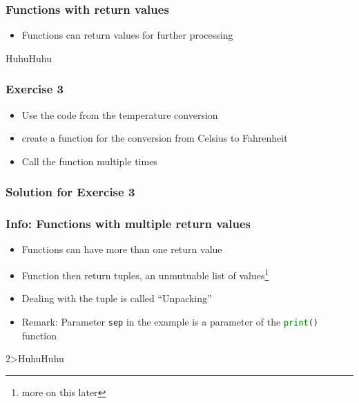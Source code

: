 \documentclass[ngerman]{beamer}
\newcommand{\ta}[1]{\textattachfile[color=1 0 0]{#1}{Code}}
\begin{document}
\begin{frame}[containsverbatim]
\frametitle{Functions with return values}

\begin{itemize}
	\item Functions can return values for further processing
\end{itemize}



\begin{ausgabe}
HuhuHuhu
\end{ausgabe}

\end{frame}


\begin{frame}
\frametitle{Exercise 3}

\begin{itemize}
\item Use the code from the temperature conversion 
\item create a function for the conversion from Celsius to Fahrenheit
\item Call the function multiple times
\end{itemize}
\end{frame}

\begin{frame}[containsverbatim]
\frametitle{Solution for Exercise 3}





\end{frame}


\begin{frame}[containsverbatim]
\frametitle{Info: Functions with multiple return values}

\begin{itemize}
	\item Functions can have more than one return value
	\item Function then return tuples, an unmutuable list of values\footnote{more on this later}
	\item Dealing with the tuple is called \enquote{Unpacking}
	\item Remark: Parameter \texttt{sep} in the example is a parameter \newline of the \lstinline[language={Python}]{print()}  function
\end{itemize}



\vspace*{-1em}
\begin{ausgabe}
2>HuhuHuhu
\end{ausgabe}
\end{frame}
\end{document}
